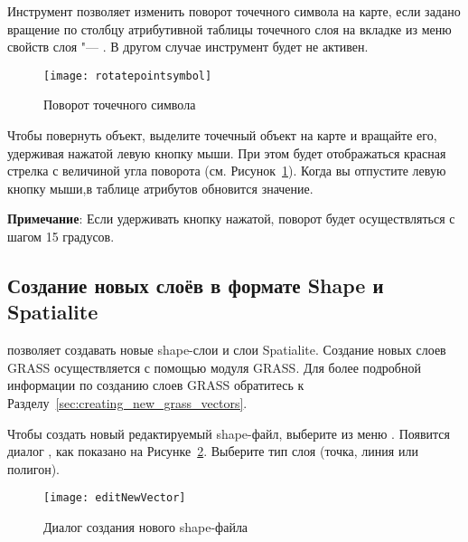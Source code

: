 
Инструмент  позволяет
изменить поворот точечного символа на карте, если задано вращение по столбцу
атрибутивной таблицы точечного слоя на вкладке  из меню
свойств слоя "--- . В другом случае инструмент будет не
активен.

\begin{figure}[ht]
   \centering
   \texttt{[image: rotatepointsymbol]}
   \caption{Поворот точечного символа \nixcaption}\label{fig:rotatepoint}
\end{figure}

Чтобы повернуть объект, выделите точечный объект на карте и вращайте его,
удерживая нажатой левую кнопку мыши. При этом будет отображаться красная
стрелка с величиной угла поворота (см. Рисунок~\ref{fig:rotatepoint}).
Когда вы отпустите левую кнопку мыши,в таблице атрибутов обновится значение.

\textbf{Примечание}: Если удерживать кнопку  нажатой, поворот
будет осуществляться с шагом 15 градусов.

\subsection{Создание новых слоёв в формате Shape и Spatialite}\label{sec:create shape}

\qg позволяет создавать новые shape-слои и слои Spatialite. Создание новых
слоев GRASS осуществляется с помощью модуля GRASS. Для более подробной
информации по созданию слоев GRASS обратитесь к Разделу~\ref{sec:creating_new_grass_vectors}.

\label{sec:create shape}

Чтобы создать новый редактируемый shape-файл, выберите  \arrow
{} из меню
. Появится диалог , как показано
на Рисунке~\ref{fig:newvectorlayer}. Выберите тип слоя (точка, линия или полигон).

\begin{figure}[ht]
   \centering
   \texttt{[image: editNewVector]}
   \caption{Диалог создания нового shape-файла \nixcaption}\label{fig:newvectorlayer}
\end{figure}

